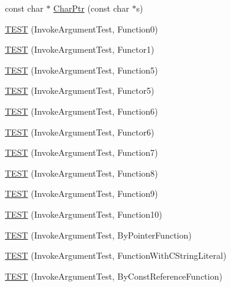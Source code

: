 \begin{DoxyCompactItemize}
const char $\ast$ \hyperlink{namespacetesting_1_1gmock__generated__actions__test_aa0f16da563ba1f4dd15c8a4fd9048fd3}{Char\+Ptr} (const char $\ast$s)
\item 
\hyperlink{namespacetesting_1_1gmock__generated__actions__test_aee4ab8d88ec59a7e3b91d919a6ed34da}{T\+E\+ST} (Invoke\+Argument\+Test, Function0)
\item 
\hyperlink{namespacetesting_1_1gmock__generated__actions__test_a47d12c8e504971d1f1c17df8d90bff82}{T\+E\+ST} (Invoke\+Argument\+Test, Functor1)
\item 
\hyperlink{namespacetesting_1_1gmock__generated__actions__test_a6afe3cf31ef3f5a9d6fd6af05c9de95c}{T\+E\+ST} (Invoke\+Argument\+Test, Function5)
\item 
\hyperlink{namespacetesting_1_1gmock__generated__actions__test_aab59917791fb297d6735d46e9a862be1}{T\+E\+ST} (Invoke\+Argument\+Test, Functor5)
\item 
\hyperlink{namespacetesting_1_1gmock__generated__actions__test_ae3f8bdac5c2ea1cf56ff1484ebb9a44e}{T\+E\+ST} (Invoke\+Argument\+Test, Function6)
\item 
\hyperlink{namespacetesting_1_1gmock__generated__actions__test_a789c7e8ee88243dc4a53841f6a8da3c6}{T\+E\+ST} (Invoke\+Argument\+Test, Functor6)
\item 
\hyperlink{namespacetesting_1_1gmock__generated__actions__test_a3e13c2ccf384c80c66116418e1b3ccde}{T\+E\+ST} (Invoke\+Argument\+Test, Function7)
\item 
\hyperlink{namespacetesting_1_1gmock__generated__actions__test_a5d583a32b46a306139d32ea9a1d575a9}{T\+E\+ST} (Invoke\+Argument\+Test, Function8)
\item 
\hyperlink{namespacetesting_1_1gmock__generated__actions__test_a3a278f02e1633feda3dea30d810a49ea}{T\+E\+ST} (Invoke\+Argument\+Test, Function9)
\item 
\hyperlink{namespacetesting_1_1gmock__generated__actions__test_afe4653b181e199417b004c4485152010}{T\+E\+ST} (Invoke\+Argument\+Test, Function10)
\item 
\hyperlink{namespacetesting_1_1gmock__generated__actions__test_ac3ff9db96cb7a664ef44d20eb0a7a71f}{T\+E\+ST} (Invoke\+Argument\+Test, By\+Pointer\+Function)
\item 
\hyperlink{namespacetesting_1_1gmock__generated__actions__test_a698f1a80b7fed18141fd170524908885}{T\+E\+ST} (Invoke\+Argument\+Test, Function\+With\+C\+String\+Literal)
\item 
\hyperlink{namespacetesting_1_1gmock__generated__actions__test_a82aff636cad2f441c584fc8e3c057d56}{T\+E\+ST} (Invoke\+Argument\+Test, By\+Const\+Reference\+Function)

\end{DoxyCompactItemize}
